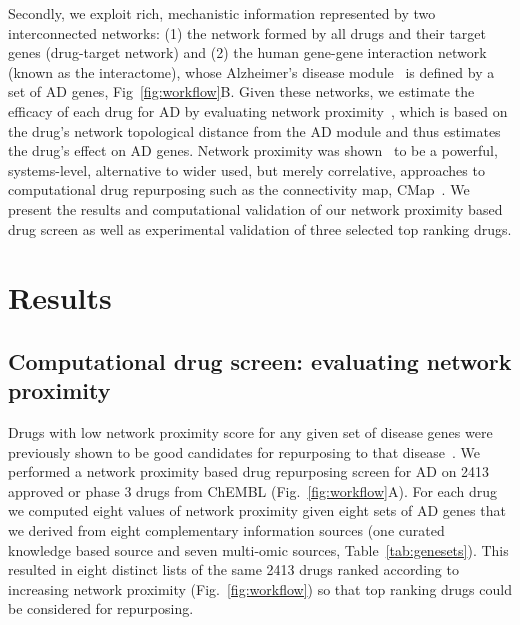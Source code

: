 \documentclass[letterpaper]{article}
\begin{document}
Secondly, we exploit rich, mechanistic information represented by two
interconnected networks: (1) the network formed by all drugs and their target
genes (drug-target network) and (2) the human gene-gene interaction network
(known as the interactome), whose Alzheimer's disease
module~\citep{Barabasi2011} is defined by a set of AD genes,
Fig~\ref{fig:workflow}B.  Given these networks, we estimate the efficacy of
each drug for AD by evaluating network proximity~\citep{Guney2016}, which is
based on the drug's network topological distance from the AD module and thus
estimates the drug's effect on AD genes.  Network proximity was
shown~\citep{Cheng2018} to be a powerful, systems-level, alternative to wider
used, but merely correlative, approaches to computational drug repurposing
such as the connectivity map, CMap~\citep{Lamb2006}.  We present the results
and computational validation of our network proximity based drug screen as well as
experimental validation of three selected top ranking drugs.

\section{Results}

\subsection{Computational drug screen: evaluating network proximity}

Drugs with low network proximity score for any given set of disease genes were
previously shown to be good candidates for repurposing to that
disease~\citep{Cheng2018}.  We performed a network proximity based drug
repurposing screen for AD on 2413 approved or phase 3 drugs from ChEMBL
(Fig.~\ref{fig:workflow}A).  For each drug we computed eight values of network
proximity given eight sets of AD genes that we derived from eight
complementary information sources (one curated knowledge based source and
seven multi-omic sources, Table~\ref{tab:genesets}).  This resulted in eight
distinct lists of the same 2413 drugs ranked according to increasing network
proximity (Fig.~\ref{fig:workflow}) so that top ranking drugs could be
considered for repurposing.
\end{document}
